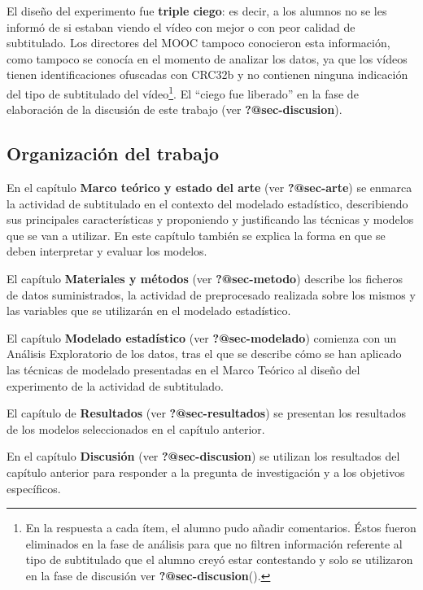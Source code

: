 \documentclass[
  letterpaper,
  DIV=11,
  numbers=noendperiod]{scrartcl}
\begin{document}
El diseño del experimento fue \textbf{triple ciego}: es decir, a los
alumnos no se les informó de si estaban viendo el vídeo con mejor o con
peor calidad de subtitulado. Los directores del MOOC tampoco conocieron
esta información, como tampoco se conocía en el momento de analizar los
datos, ya que los vídeos tienen identificaciones ofuscadas con CRC32b y
no contienen ninguna indicación del tipo de subtitulado del
vídeo\footnote{En la respuesta a cada ítem, el alumno pudo añadir
  comentarios. Éstos fueron eliminados en la fase de análisis para que
  no filtren información referente al tipo de subtitulado que el alumno
  creyó estar contestando y solo se utilizaron en la fase de discusión
  ver \textbf{?@sec-discusion}().}. El ``ciego fue liberado'' en la fase
de elaboración de la discusión de este trabajo (ver
\textbf{?@sec-discusion}).

\hypertarget{organizaciuxf3n-del-trabajo}{%
\subsection{Organización del
trabajo}\label{organizaciuxf3n-del-trabajo}}

En el capítulo \textbf{Marco teórico y estado del arte} (ver
\textbf{?@sec-arte}) se enmarca la actividad de subtitulado en el
contexto del modelado estadístico, describiendo sus principales
características y proponiendo y justificando las técnicas y modelos que
se van a utilizar. En este capítulo también se explica la forma en que
se deben interpretar y evaluar los modelos.

El capítulo \textbf{Materiales y métodos} (ver \textbf{?@sec-metodo})
describe los ficheros de datos suministrados, la actividad de
preprocesado realizada sobre los mismos y las variables que se
utilizarán en el modelado estadístico.

El capítulo \textbf{Modelado estadístico} (ver \textbf{?@sec-modelado})
comienza con un Análisis Exploratorio de los datos, tras el que se
describe cómo se han aplicado las técnicas de modelado presentadas en el
Marco Teórico al diseño del experimento de la actividad de subtitulado.

El capítulo de \textbf{Resultados} (ver \textbf{?@sec-resultados}) se
presentan los resultados de los modelos seleccionados en el capítulo
anterior.

En el capítulo \textbf{Discusión} (ver \textbf{?@sec-discusion}) se
utilizan los resultados del capítulo anterior para responder a la
pregunta de investigación y a los objetivos específicos.
\end{document}

